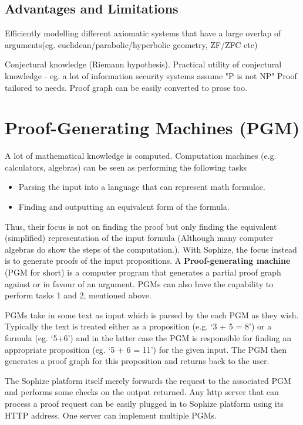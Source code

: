 \documentclass[a4paper]{article}
\begin{document}
\subsection{Advantages and Limitations}

Efficiently modelling different axiomatic systems that have a large overlap of arguments(eg. euclidean/parabolic/hyperbolic geometry, ZF/ZFC etc)

Conjectural knowledge (Riemann hypothesis). 
Practical utility of conjectural knowledge - eg. a lot of information security systems assume "P is not NP"
Proof tailored to needs. Proof graph can be easily converted to prose too.

\section{Proof-Generating Machines (PGM)}
\label{sec:pgm}
A lot of mathematical knowledge is computed. Computation machines (e.g. calculators, algebras) can be seen as performing the following tasks
\begin{itemize}
\item Parsing the input into a language that can represent math formulae. 
\item Finding and outputting an equivalent form of the formula.
\end{itemize}
Thus, their focus is not on finding the proof but only finding the equivalent (simplified) representation of the input formula (Although many computer algebras do show the steps of the computation.). With Sophize, the focus instead is to generate proofs of the input propositions. A \textbf{Proof-generating machine} (PGM for short) is a computer program that generates a partial proof graph against or in favour of an argument. PGMs can also have the capability to perform tasks 1 and 2, mentioned above.

PGMs take in some text as input which is parsed by the each PGM as they wish. Typically the text is treated either as a proposition (e.g. `3 + 5 = 8') or a formula (eg. `5+6') and in the latter case the PGM is responsible for finding an appropriate proposition (eg. `5 + 6 = 11') for the given input. The PGM then generates a proof graph for this proposition and returns back to the user.

The Sophize platform itself merely forwards the request to the associated PGM and performs some checks on the output returned. Any http server that can process a proof request can be easily plugged in to Sophize platform using its HTTP address. One server can implement multiple PGMs.
\end{document}
